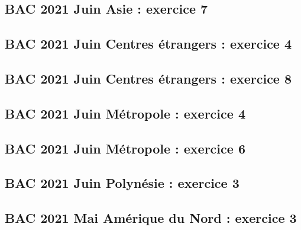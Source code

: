 \documentclass[lang=fr,edition=teacher,layout=sheet]{mxbook}
\begin{document}
\begingroup\endgroup
\par\bigskip
{}\subsection*{BAC 2021 Juin Asie : exercice 7}
\begingroup\endgroup
\par\bigskip
{}\subsection*{BAC 2021 Juin Centres étrangers : exercice 4}
\begingroup\endgroup
\par\bigskip
{}\subsection*{BAC 2021 Juin Centres étrangers : exercice 8}
\begingroup\endgroup
\par\bigskip
{}\subsection*{BAC 2021 Juin Métropole : exercice 4}
\begingroup\endgroup
\par\bigskip
{}\subsection*{BAC 2021 Juin Métropole : exercice 6}
\begingroup\endgroup
\par\bigskip
{}\subsection*{BAC 2021 Juin Polynésie : exercice 3}
\begingroup\endgroup
\par\bigskip
{}\subsection*{BAC 2021 Mai Amérique du Nord : exercice 3}
\end{document}
